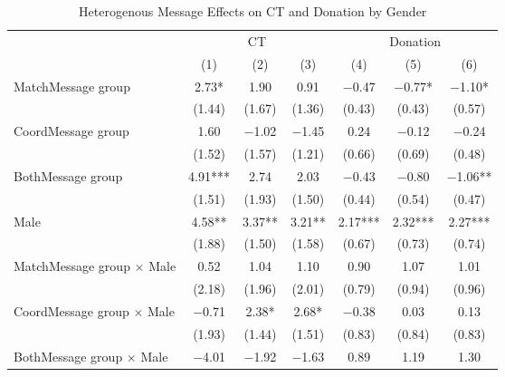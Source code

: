 \documentclass[12pt, a4paper]{article}
\begin{document}
\begin{table}[H]
\begin{threeparttable}
\begin{tablenotes}
\end{tablenotes}
\end{threeparttable}
\end{table}

\begin{table}[H]

\caption{\label{tab:lm-interaction-gender-test-donate}Heterogenous Message Effects on CT and Donation by Gender}
\centering
\fontsize{8}{10}\selectfont
\begin{threeparttable}
\begin{tabular}[t]{>{\raggedright\arraybackslash}p{30em}cccccc}
\toprule
\multicolumn{1}{c}{ } & \multicolumn{3}{c}{CT} & \multicolumn{3}{c}{Donation} \\
\cmidrule(l{3pt}r{3pt}){2-4} \cmidrule(l{3pt}r{3pt}){5-7}
  & (1) & (2) & (3) & (4) & (5) & (6)\\
\midrule
MatchMessage group & \num{2.73}* & \num{1.90} & \num{0.91} & \num{-0.47} & \num{-0.77}* & \num{-1.10}*\\
 & (\num{1.44}) & (\num{1.67}) & (\num{1.36}) & (\num{0.43}) & (\num{0.43}) & (\num{0.57})\\
CoordMessage group & \num{1.60} & \num{-1.02} & \num{-1.45} & \num{0.24} & \num{-0.12} & \num{-0.24}\\
 & (\num{1.52}) & (\num{1.57}) & (\num{1.21}) & (\num{0.66}) & (\num{0.69}) & (\num{0.48})\\
BothMessage group & \num{4.91}*** & \num{2.74} & \num{2.03} & \num{-0.43} & \num{-0.80} & \num{-1.06}**\\
 & (\num{1.51}) & (\num{1.93}) & (\num{1.50}) & (\num{0.44}) & (\num{0.54}) & (\num{0.47})\\
Male & \num{4.58}** & \num{3.37}** & \num{3.21}** & \num{2.17}*** & \num{2.32}*** & \num{2.27}***\\
 & (\num{1.88}) & (\num{1.50}) & (\num{1.58}) & (\num{0.67}) & (\num{0.73}) & (\num{0.74})\\
MatchMessage group $\times$ Male & \num{0.52} & \num{1.04} & \num{1.10} & \num{0.90} & \num{1.07} & \num{1.01}\\
 & (\num{2.18}) & (\num{1.96}) & (\num{2.01}) & (\num{0.79}) & (\num{0.94}) & (\num{0.96})\\
CoordMessage group $\times$ Male & \num{-0.71} & \num{2.38}* & \num{2.68}* & \num{-0.38} & \num{0.03} & \num{0.13}\\
 & (\num{1.93}) & (\num{1.44}) & (\num{1.51}) & (\num{0.83}) & (\num{0.84}) & (\num{0.83})\\
BothMessage group $\times$ Male & \num{-4.01} & \num{-1.92} & \num{-1.63} & \num{0.89} & \num{1.19} & \num{1.30}\\

\end{tabular}
\end{threeparttable}
\end{table}
\end{document}
